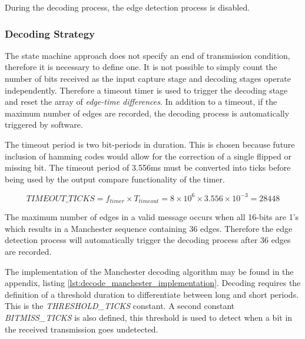 During the decoding process, the edge detection process is disabled.

\subsubsection{Decoding Strategy}

The state machine approach does not specify an end of transmission condition, therefore it is necessary to define one. It is not possible to simply count the number of bits received as the input capture stage and decoding stages operate independently. Therefore a timeout timer is used to trigger the decoding stage and reset the array of \textit{edge-time differences}. In addition to a timeout, if the maximum number of edges are recorded, the decoding process is automatically triggered by software.

The timeout period is two bit-periods in duration. This is chosen because future inclusion of hamming codes would allow for the correction of a single flipped or missing bit. The timeout period of 3.556ms must be converted into ticks before being used by the output compare functionality of the timer.

\[TIMEOUT\_TICKS = f_{timer} \times T_{timeout} = 8 \times 10^6 \times 3.556 \times 10^{-3} = 28448\]

The maximum number of edges in a valid message occurs when all 16-bits are 1's which results in a Manchester sequence containing 36 edges. Therefore the edge detection process will automatically trigger the decoding process after 36 edges are recorded.

The implementation of the Manchester decoding algorithm may be found in the appendix, listing \ref{lst:decode_manchester_implementation}. Decoding requires the definition of a threshold duration to differentiate between long and short periods. This is the \textit{THRESHOLD\_TICKS} constant. A second constant \textit{BITMISS\_TICKS} is also defined, this threshold is used to detect when a bit in the received transmission goes undetected.








